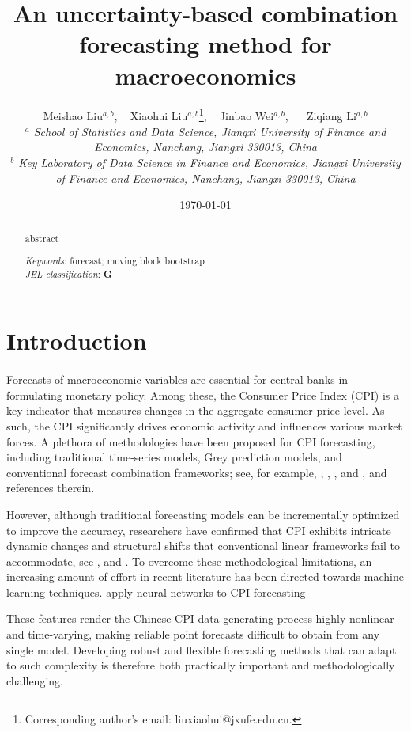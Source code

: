 \documentclass[12pt]{article}
\title{An uncertainty-based combination forecasting method for macroeconomics}
\author{{Meishao Liu$^{a,b}$, ~ Xiaohui Liu$^{a,b}$\footnote{Corresponding author's email: liuxiaohui@jxufe.edu.cn.}, ~ Jinbao Wei$^{a,b}$, ~~ Ziqiang Li$^{a,b}$
        }\\
        {\em\footnotesize $^a$ School of Statistics and Data Science, Jiangxi University of Finance and Economics, Nanchang, Jiangxi 330013, China}\\
        {\em\footnotesize $^b$ Key Laboratory of Data Science in Finance and  Economics, Jiangxi University of Finance and Economics, Nanchang, Jiangxi 330013, China}\\
}
\date{\today}
\begin{document}
\maketitle
\begin{abstract}
\noindent
    abstract

\vspace{0.5cm}

\bigskip
\noindent \textit{Keywords}: forecast; moving block bootstrap\\
\noindent \textit{JEL classification}: \textbf{G}
\end{abstract}


 \newpage
\setcounter{page}{1}
\section{Introduction}
\paragraph{}
Forecasts of macroeconomic variables are essential for central banks in formulating monetary policy. Among these, the Consumer Price Index (CPI) is a key indicator that measures changes in the aggregate consumer price level. As such, the CPI significantly drives economic activity and influences various market forces. A plethora of methodologies have been proposed for CPI forecasting, including traditional time-series models, Grey prediction models, and conventional forecast combination frameworks; see, for example, \cite{elliott2004optimal}, \cite{FAUST20132}, \cite{norouzi2020black}, and \cite{chen2023time}, and references therein.

However, although traditional forecasting models can be incrementally optimized to improve the accuracy, researchers have confirmed that CPI exhibits intricate dynamic changes and structural shifts that conventional linear frameworks fail to accommodate, see \cite{zhang2008structural}, \cite{wang2016improving} and \cite{pratap2019macroeconomic}. To overcome these methodological limitations, an increasing amount of effort in recent literature has been directed towards machine learning techniques. \cite{barkan2023forecasting} apply neural networks to CPI forecasting




These features render the Chinese CPI data-generating process highly nonlinear and time-varying, making reliable point forecasts difficult to obtain from any single model. Developing robust and flexible forecasting methods that can adapt to such complexity is therefore both practically important and methodologically challenging.
\end{document}
